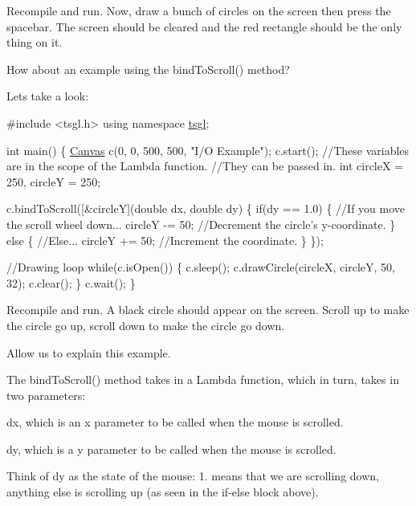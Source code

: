 Recompile and run. Now, draw a bunch of circles on the screen then press the spacebar. The screen should be cleared and the red rectangle should be the only thing on it.

How about an example using the bind\+To\+Scroll() method?

Let\textquotesingle{}s take a look\+:


\begin{DoxyCode}
\textcolor{preprocessor}{#include <tsgl.h>}
\textcolor{keyword}{using namespace }\hyperlink{namespacetsgl}{tsgl};

\textcolor{keywordtype}{int} main() \{
  \hyperlink{classtsgl_1_1_canvas}{Canvas} c(0, 0, 500, 500, \textcolor{stringliteral}{"I/O Example"});
  c.start();
  \textcolor{comment}{//These variables are in the scope of the Lambda function.}
  \textcolor{comment}{//They can be passed in.}
  \textcolor{keywordtype}{int} circleX = 250, circleY = 250;

  c.bindToScroll([&circleY](\textcolor{keywordtype}{double} dx, \textcolor{keywordtype}{double} dy) \{
    \textcolor{keywordflow}{if}(dy == 1.0) \{ \textcolor{comment}{//If you move the scroll wheel down...}
      circleY -= 50;  \textcolor{comment}{//Decrement the circle's y-coordinate.}
    \} \textcolor{keywordflow}{else} \{ \textcolor{comment}{//Else...}
      circleY += 50;  \textcolor{comment}{//Increment the coordinate.}
    \}
  \});

  \textcolor{comment}{//Drawing loop}
  \textcolor{keywordflow}{while}(c.isOpen()) \{
    c.sleep();
    c.drawCircle(circleX, circleY, 50, 32);
    c.clear();
  \}
  c.wait();
\}
\end{DoxyCode}


Recompile and run. A black circle should appear on the screen. Scroll up to make the circle go up, scroll down to make the circle go down.

Allow us to explain this example.

The bind\+To\+Scroll() method takes in a Lambda function, which in turn, takes in two parameters\+:
\begin{DoxyItemize}
\item dx, which is an x parameter to be called when the mouse is scrolled.
\item dy, which is a y parameter to be called when the mouse is scrolled.
\end{DoxyItemize}

Think of dy as the state of the mouse\+: 1. means that we are scrolling down, anything else is scrolling up (as seen in the if-\/else block above).

